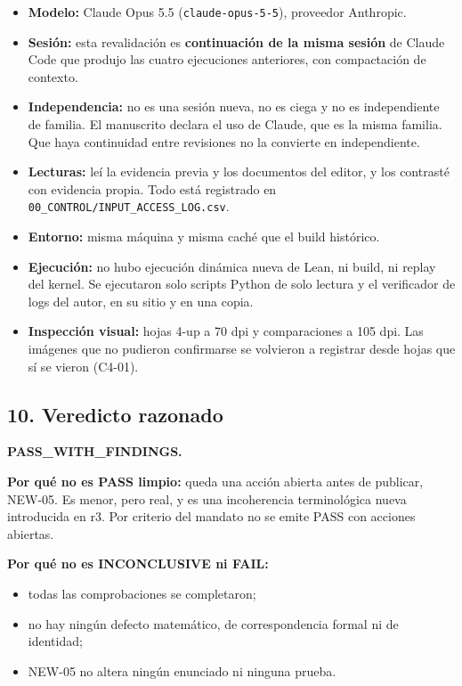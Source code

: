 \documentclass[
]{article}
\providecommand{\tightlist}{%
  \setlength{\itemsep}{0pt}\setlength{\parskip}{0pt}}
\begin{document}
\begin{itemize}
\tightlist
\item
  \textbf{Modelo:} Claude Opus 5.5 (\texttt{claude-opus-5-5}), proveedor
  Anthropic.
\item
  \textbf{Sesión:} esta revalidación es \textbf{continuación de la misma
  sesión} de Claude Code que produjo las cuatro ejecuciones anteriores,
  con compactación de contexto.
\item
  \textbf{Independencia:} no es una sesión nueva, no es ciega y no es
  independiente de familia. El manuscrito declara el uso de Claude, que
  es la misma familia. Que haya continuidad entre revisiones no la
  convierte en independiente.
\item
  \textbf{Lecturas:} leí la evidencia previa y los documentos del
  editor, y los contrasté con evidencia propia. Todo está registrado en
  \texttt{00\_CONTROL/INPUT\_ACCESS\_LOG.csv}.
\item
  \textbf{Entorno:} misma máquina y misma caché que el build histórico.
\item
  \textbf{Ejecución:} no hubo ejecución dinámica nueva de Lean, ni
  build, ni replay del kernel. Se ejecutaron solo scripts Python de solo
  lectura y el verificador de logs del autor, en su sitio y en una
  copia.
\item
  \textbf{Inspección visual:} hojas 4-up a 70 dpi y comparaciones a 105
  dpi. Las imágenes que no pudieron confirmarse se volvieron a registrar
  desde hojas que sí se vieron (C4-01).
\end{itemize}

\subsection{10. Veredicto razonado}\label{10-veredicto-razonado}

\textbf{PASS\_WITH\_FINDINGS.}

\textbf{Por qué no es PASS limpio:} queda una acción abierta antes de
publicar, NEW-05. Es menor, pero real, y es una incoherencia
terminológica nueva introducida en r3. Por criterio del mandato no se
emite PASS con acciones abiertas.

\textbf{Por qué no es INCONCLUSIVE ni FAIL:}

\begin{itemize}
\tightlist
\item
  todas las comprobaciones se completaron;
\item
  no hay ningún defecto matemático, de correspondencia formal ni de
  identidad;
\item
  NEW-05 no altera ningún enunciado ni ninguna prueba.
\end{itemize}
\end{document}
